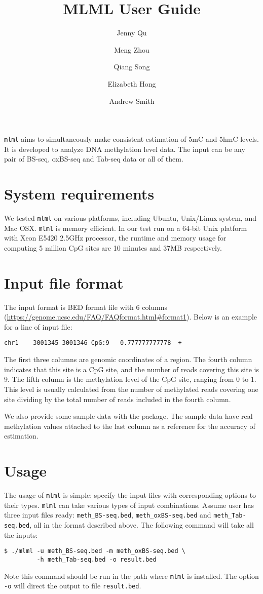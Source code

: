 \documentclass[11pt]{article}
\title{MLML User Guide}
\author{Jenny Qu \and Meng Zhou \and Qiang Song \and Elizabeth Hong \and Andrew Smith}
\newcommand{\prog}[1]{\texttt{#1}}
\newcommand{\fn}[1]{\texttt{#1}}
\newcommand{\op}[1]{\texttt{#1}}
\begin{document}
\maketitle

\prog{mlml} aims to simultaneously make consistent estimation of 5mC and 5hmC levels. It is developed to analyze DNA methylation level data. The input can be any pair of BS-seq, oxBS-seq and Tab-seq data or all of them.

\section{System requirements}
We tested \prog{mlml} on various platforms, including Ubuntu, Unix/Linux system, and Mac OSX. \prog{mlml} is memory efficient. In our test run on a 64-bit Unix platform with Xeon E5420 2.5GHz processor, the runtime and memory usage for computing 5 million CpG sites are 10 minutes and 37MB respectively.

\section{Input file format}
The input format is BED format file with 6 columns (\url{https://genome.ucsc.edu/FAQ/FAQformat.html\#format1}). Below is an example for a line of input file:
\begin{verbatim}
chr1    3001345 3001346 CpG:9   0.777777777778  +
\end{verbatim}

\noindent
The first three columns are genomic coordinates of a region. The fourth column indicates that this site is a CpG site, and the number of reads covering this site is 9. The fifth column is the methylation level of the CpG site, ranging from 0 to 1. This level is usually calculated from the number of methylated reads covering one site dividing by the total number of reads included in the fourth column.

We also provide some sample data with the package. The sample data have real methylation values attached to the last column as a reference for the accuracy of estimation.

\section{Usage}
The usage of \prog{mlml} is simple: specify the input files with corresponding options to their types. \prog{mlml} can take various types of input combinations. Assume user has three input files ready: \fn{meth\_BS-seq.bed}, \fn{meth\_oxBS-seq.bed} and \fn{meth\_Tab-seq.bed}, all in the format described above. The following command will take all the inputs:
\begin{verbatim}
$ ./mlml -u meth_BS-seq.bed -m meth_oxBS-seq.bed \
         -h meth_Tab-seq.bed -o result.bed
\end{verbatim}
Note this command should be run in the path where \prog{mlml} is installed. The option \op{-o} will direct the output to file \fn{result.bed}.
\end{document}
